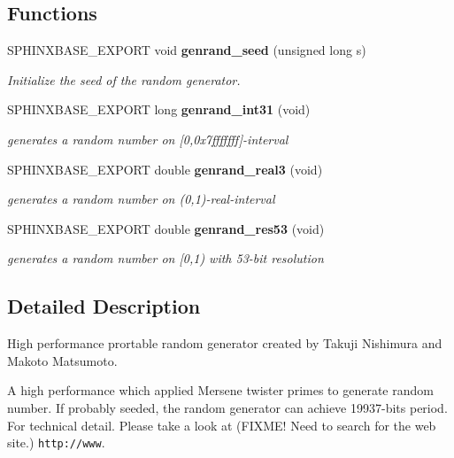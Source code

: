 \subsection*{Functions}
\begin{DoxyCompactItemize}
\item 
\mbox{\label{genrand_8h_a2881c7b606d9a2b2852e5946d71d32b7}} 
S\+P\+H\+I\+N\+X\+B\+A\+S\+E\+\_\+\+E\+X\+P\+O\+RT void \textbf{ genrand\+\_\+seed} (unsigned long s)
\begin{DoxyCompactList}\small\item\em Initialize the seed of the random generator. \end{DoxyCompactList}\item 
\mbox{\label{genrand_8h_a10263695978c84103fb3526fdae21d4c}} 
S\+P\+H\+I\+N\+X\+B\+A\+S\+E\+\_\+\+E\+X\+P\+O\+RT long \textbf{ genrand\+\_\+int31} (void)
\begin{DoxyCompactList}\small\item\em generates a random number on [0,0x7fffffff]-\/interval \end{DoxyCompactList}\item 
\mbox{\label{genrand_8h_ad5fbfda1cb738d2beff277444bc71b1a}} 
S\+P\+H\+I\+N\+X\+B\+A\+S\+E\+\_\+\+E\+X\+P\+O\+RT double \textbf{ genrand\+\_\+real3} (void)
\begin{DoxyCompactList}\small\item\em generates a random number on (0,1)-\/real-\/interval \end{DoxyCompactList}\item 
\mbox{\label{genrand_8h_a2fca03c5dad1835f55e09c6e66d3b960}} 
S\+P\+H\+I\+N\+X\+B\+A\+S\+E\+\_\+\+E\+X\+P\+O\+RT double \textbf{ genrand\+\_\+res53} (void)
\begin{DoxyCompactList}\small\item\em generates a random number on [0,1) with 53-\/bit resolution \end{DoxyCompactList}\end{DoxyCompactItemize}


\subsection{Detailed Description}
High performance prortable random generator created by Takuji Nishimura and Makoto Matsumoto. 

A high performance which applied Mersene twister primes to generate random number. If probably seeded, the random generator can achieve 19937-\/bits period. For technical detail. Please take a look at (F\+I\+X\+M\+E! Need to search for the web site.) {\tt http\+://www}. 